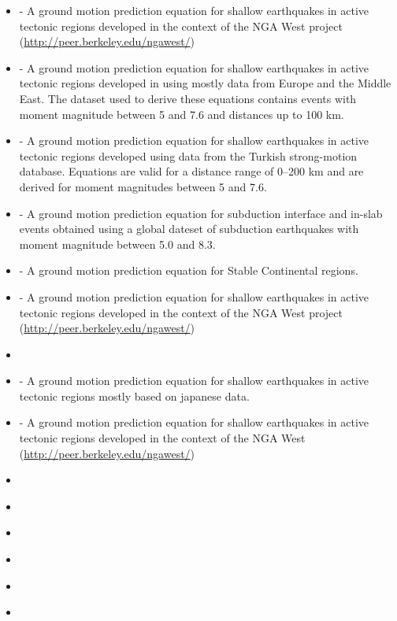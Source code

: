 \begin{itemize} 
    \item \cite{abrahamson2008} - A ground motion prediction equation 
    for shallow earthquakes in active tectonic regions developed in 
    the context of the NGA West project
    (\href{http://peer.berkeley.edu/ngawest/}{http://peer.berkeley.edu/ngawest/})
    \item \cite{akkar2010} - A ground motion prediction equation 
    for shallow earthquakes in active tectonic regions developed in 
    using mostly data from Europe and the Middle East. The dataset 
    used to derive these equations contains events with moment 
    magnitude between 5 and 7.6 and distances up to 100 km.
    \item \cite{akkar2010a} - A ground motion prediction equation for shallow
    earthquakes in active tectonic regions developed using data from the 
    Turkish strong-motion database. Equations are valid for a distance 
    range of 0–200 km and are derived for moment magnitudes 
    between 5 and 7.6.
    \item \cite{atkinson2003} - A ground motion prediction equation for 
    subduction interface and in-slab events obtained using a global 
    dateset of subduction earthquakes with moment magnitude between 
    5.0 and 8.3.
    \item \cite{atkinson2006} - A ground motion prediction equation for 
    Stable Continental regions.
    \item \cite{boore2008} - A ground motion prediction equation 
    for shallow earthquakes in active tectonic regions developed in 
    the context of the NGA West project 
    (\href{http://peer.berkeley.edu/ngawest/}{http://peer.berkeley.edu/ngawest/})
    \item \cite{campbell2003}
    \item \cite{cauzzi2008} - A ground motion prediction equation 
    for shallow earthquakes in active tectonic regions mostly based 
    on japanese data.
    \item \cite{chiou2008} - A ground motion prediction equation 
    for shallow earthquakes in active tectonic regions developed in 
    the context of the NGA West
    (\href{http://peer.berkeley.edu/ngawest/}{http://peer.berkeley.edu/ngawest/})
    \item \cite{faccioli2010}
    \item \cite{lin2008}
    \item \cite{sadigh1997}
    \item \cite{toro2002}
    \item \cite{youngs1997}
    \item \cite{zhao2006} 
\end{itemize}
